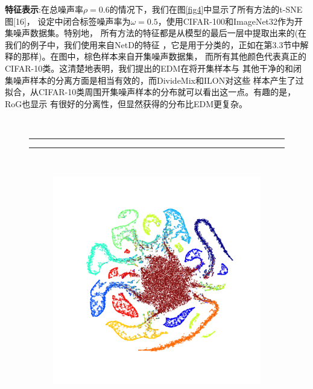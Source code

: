 \documentclass[11pt]{article}
\begin{document}
\textbf{特征表示}:在总噪声率$\rho = 0.6$的情况下，我们在图\ref{fig4}中显示了所有方法的t-SNE图[16]，
设定中闭合标签噪声率为$\omega = 0.5$，使用CIFAR-100和ImageNet32作为开集噪声数据集。特别地，
所有方法的特征都是从模型的最后一层中提取出来的(在我们的例子中，我们使用来自NetD的特征
，它是用于分类的，正如在第3.3节中解释的那样)。在图中，棕色样本来自开集噪声数据集，
而所有其他颜色代表真正的CIFAR-10类。这清楚地表明，我们提出的EDM在将开集样本与
其他干净的和闭集噪声样本的分离方面是相当有效的，而DivideMix和ILON对这些
样本产生了过拟合，从CIFAR-10类周围开集噪声样本的分布就可以看出这一点。有趣的是，RoG也显示
有很好的分离性，但显然获得的分布比EDM更复杂。
\begin{figure}[h]
  \centering
    \\
  \noindent \hspace*{5mm}  \rule{5cm}{0.5pt} \hspace{7mm} \rule{5cm}{0.5pt}
  \\
  \begin{subfigure}{.18\textwidth}
    \centering
    \includegraphics[width=\linewidth]{images/tsne/tsne_ROG_imagenet32.png}

\end{subfigure}
\end{figure}
\end{document}

